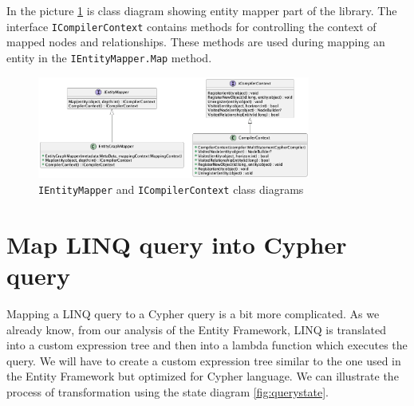 In the picture \ref{fig:IEntityMapperClassDiagram} is class diagram showing entity mapper part of the library.
The interface \texttt{ICompilerContext} contains methods for controlling the context of mapped nodes and relationships.
These methods are used during mapping an entity in the \texttt{IEntityMapper.Map} method.

\begin{figure}[H]
	\centering
	\includegraphics[width=0.8\textwidth]{content/entitymapper.png}
	\caption{\texttt{IEntityMapper} and \texttt{ICompilerContext} class diagrams}
	\label{fig:IEntityMapperClassDiagram}
\end{figure}

\section {Map LINQ query into Cypher query}

Mapping a LINQ query to a Cypher query is a bit more complicated.
As we already know, from our analysis of the Entity Framework, LINQ is translated into a custom expression tree and then into a lambda function which executes the query.
We will have to create a custom expression tree similar to the one used in the Entity Framework but optimized for Cypher language.
We can illustrate the process of transformation using the state diagram
\ref{fig:querystate}.

